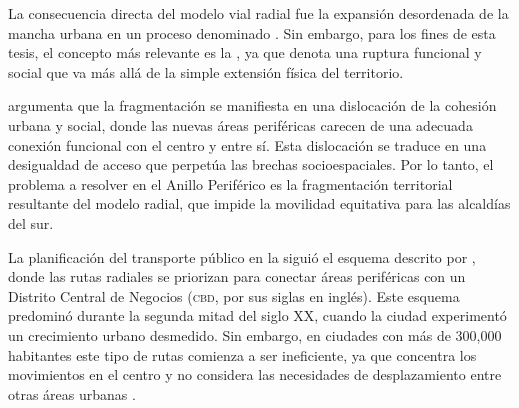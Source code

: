 
La consecuencia directa del modelo vial radial fue la expansión desordenada de
la mancha urbana en un proceso denominado . Sin embargo,
para los fines de esta tesis, el concepto más relevante es la
, ya que denota una ruptura funcional y social que
va más allá de la simple extensión física del territorio.

\citet{padilla2007} argumenta que la fragmentación se manifiesta en una
dislocación de la cohesión urbana y social, donde las nuevas áreas periféricas
carecen de una adecuada conexión funcional con el centro y entre sí. Esta
dislocación se traduce en una desigualdad de acceso que perpetúa las brechas
socioespaciales. Por lo tanto, el problema a resolver en el Anillo Periférico es
la fragmentación territorial resultante del modelo radial, que impide la
movilidad equitativa para las alcaldías del sur.

\label{subsec:limitaciones-radial}

La planificación del transporte público en la \cdmx{} siguió el esquema descrito
por \citet{molinero2002}, donde las rutas radiales se priorizan para conectar
áreas periféricas con un Distrito Central de Negocios (\textsc{cbd}, por sus
siglas en inglés). Este esquema predominó durante la segunda mitad del siglo XX,
cuando la ciudad experimentó un crecimiento urbano desmedido. Sin embargo, en
ciudades con más de 300,000 habitantes este tipo de rutas comienza a ser
ineficiente, ya que concentra los movimientos en el centro y no considera las
necesidades de desplazamiento entre otras áreas urbanas \citep{molinero2002}.
